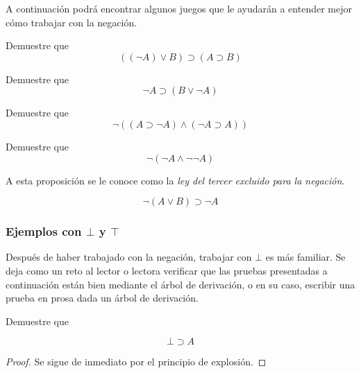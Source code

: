 \documentclass{article}
\begin{document}
A continuación podrá encontrar algunos juegos que le ayudarán a entender mejor
cómo trabajar con la negación.

\begin{exercise}
    Demuestre que 
    $$((\neg A) \lor B) \supset (A \supset B)$$
\end{exercise}

\begin{exercise}
    Demuestre que 
    $$
        \neg A \supset (B \lor \neg A)
    $$
\end{exercise}

\begin{exercise}
    Demuestre que
    $$
        \neg ((A \supset \neg A) \land (\neg A \supset A))
    $$
\end{exercise}

\begin{exercise}
    Demuestre que
    $$
        \neg (\neg A \land \neg \neg A)
    $$

    A esta proposición se le conoce como la \textit{ley del tercer excluido para la negación}.
\end{exercise}

\begin{exercise}
    $$
        \neg(A \lor B) \supset \neg A
    $$
\end{exercise}

\subsubsection{Ejemplos con $\bot$ y $\top$}

Después de haber trabajado con la negación, trabajar con $\bot$ es más familiar.
Se deja como un reto al lector o lectora verificar que las pruebas presentadas
a continuación están bien mediante el árbol de derivación, o en su caso, 
escribir una prueba en prosa dada un árbol de derivación.

\begin{example}
    Demuestre que

    $$
        \bot \supset A
    $$

    \begin{proof}
        \hfill\newline

        Se sigue de inmediato por el principio de explosión.
    \end{proof}
\end{example}
\end{document}
